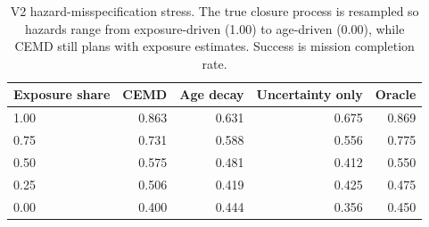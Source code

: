 \begin{table}[t]
\centering
\caption{V2 hazard-misspecification stress. The true closure process is resampled so hazards range from exposure-driven (1.00) to age-driven (0.00), while CEMD still plans with exposure estimates. Success is mission completion rate.}
\label{tab:hazard-misspecification}
\begin{tabular}{lrrrr}
\toprule
Exposure share & CEMD & Age decay & Uncertainty only & Oracle \\
\midrule
1.00 & 0.863 & 0.631 & 0.675 & 0.869 \\
0.75 & 0.731 & 0.588 & 0.556 & 0.775 \\
0.50 & 0.575 & 0.481 & 0.412 & 0.550 \\
0.25 & 0.506 & 0.419 & 0.425 & 0.475 \\
0.00 & 0.400 & 0.444 & 0.356 & 0.450 \\
\bottomrule
\end{tabular}
\end{table}
